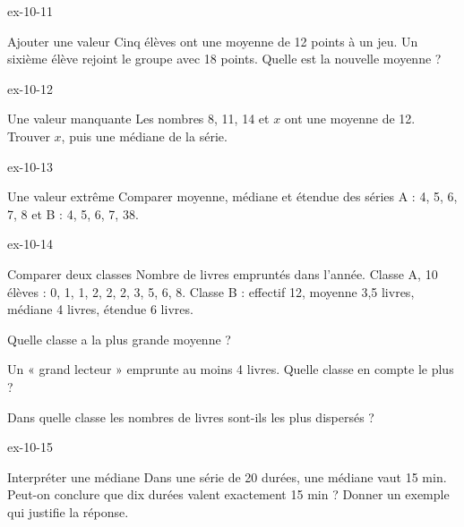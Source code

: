 \begin{blocLivre}{ex-10-11}\begin{exercice}[3]{Ajouter une valeur}
Cinq élèves ont une moyenne de 12 points à un jeu. Un sixième élève rejoint le groupe avec 18 points. Quelle est la nouvelle moyenne ?
\end{exercice}\end{blocLivre}
\begin{blocLivre}{ex-10-12}\begin{exercice}[3]{Une valeur manquante}
Les nombres 8, 11, 14 et $x$ ont une moyenne de 12. Trouver $x$, puis une médiane de la série.
\end{exercice}\end{blocLivre}
\begin{blocLivre}{ex-10-13}\begin{exercice}[3]{Une valeur extrême}
Comparer moyenne, médiane et étendue des séries A : 4, 5, 6, 7, 8 et B : 4, 5, 6, 7, 38.
\end{exercice}\end{blocLivre}
\begin{blocLivre}{ex-10-14}\begin{exercice}[3]{Comparer deux classes}
Nombre de livres empruntés dans l’année. Classe A, 10 élèves : 0, 1, 1, 2, 2, 2, 3, 5, 6, 8. Classe B : effectif 12, moyenne 3,5 livres, médiane 4 livres, étendue 6 livres.\begin{questions}
\item Quelle classe a la plus grande moyenne ?
\item Un « grand lecteur » emprunte au moins 4 livres. Quelle classe en compte le plus ?
\item Dans quelle classe les nombres de livres sont-ils les plus dispersés ?
\end{questions}
\end{exercice}\end{blocLivre}
\begin{blocLivre}{ex-10-15}\begin{exercice}[3]{Interpréter une médiane}
Dans une série de 20 durées, une médiane vaut 15 min. Peut-on conclure que dix durées valent exactement 15 min ? Donner un exemple qui justifie la réponse.
\end{exercice}\end{blocLivre}

\clearpage
